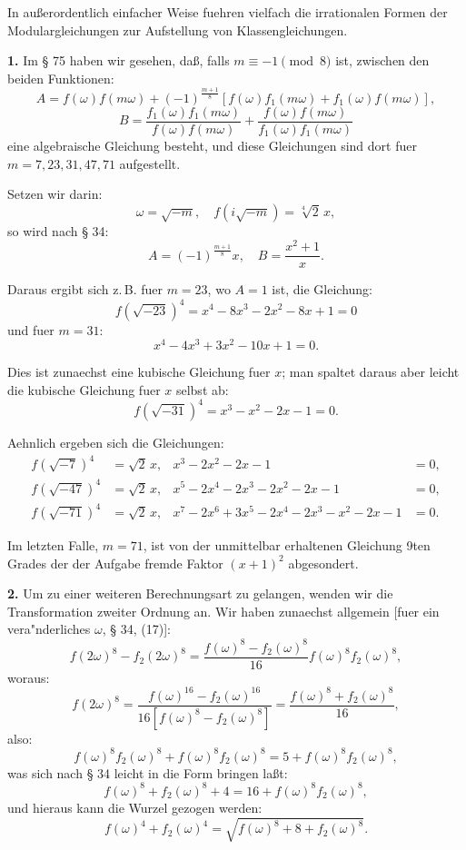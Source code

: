 \documentclass[12pt,a4paper]{article}
\theoremstyle{plain}
\theoremstyle{definition}
\theoremstyle{remark}
\begin{document}
In au\ss{}erordentlich einfacher Weise fuehren vielfach die irrationalen Formen der Modulargleichungen zur Aufstellung von Klassengleichungen.

\textbf{1.} Im \S{} 75 haben wir gesehen, da\ss{}, falls $m \equiv -1 \pmod{8}$ ist, zwischen den beiden Funktionen:
\[
A = f(\omega)f(m\omega) + (-1)^{\frac{m+1}{8}} \left[f(\omega)f_1(m\omega) + f_1(\omega)f(m\omega)\right],
\]
\[
B = \frac{f_1(\omega)f_1(m\omega)}{f(\omega)f(m\omega)} + \frac{f(\omega)f(m\omega)}{f_1(\omega)f_1(m\omega)}
\]
eine algebraische Gleichung besteht, und diese Gleichungen sind dort fuer $m = 7, 23, 31, 47, 71$ aufgestellt.

Setzen wir darin:
\[
\omega = \sqrt{-m}, \quad f(i\sqrt{-m}) = \sqrt[4]{2}\, x,
\]
so wird nach \S{} 34:
\[
A = (-1)^{\frac{m+1}{8}} x, \quad B = \frac{x^2 + 1}{x}.
\]

Daraus ergibt sich z.\,B. fuer $m = 23$, wo $A = 1$ ist, die Gleichung:
\begin{equation}\label{eq:131_1}
f(\sqrt{-23})^4 = x^4 - 8x^3 - 2x^2 - 8x + 1 = 0
\end{equation}
und fuer $m = 31$:
\begin{equation}\label{eq:131_2}
x^4 - 4x^3 + 3x^2 - 10x + 1 = 0.
\end{equation}

Dies ist zunaechst eine kubische Gleichung fuer $x$; man spaltet daraus aber leicht die kubische Gleichung fuer $x$ selbst ab:
\begin{equation}\label{eq:131_3}
f(\sqrt{-31})^4 = x^3 - x^2 - 2x - 1 = 0.
\end{equation}

Aehnlich ergeben sich die Gleichungen:
\begin{align}
f(\sqrt{-7})^4 &= \sqrt{2}\, x, & x^3 - 2x^2 - 2x - 1 &= 0, \label{eq:131_4}\\
f(\sqrt{-47})^4 &= \sqrt{2}\, x, & x^5 - 2x^4 - 2x^3 - 2x^2 - 2x - 1 &= 0, \label{eq:131_5}\\
f(\sqrt{-71})^4 &= \sqrt{2}\, x, & x^7 - 2x^6 + 3x^5 - 2x^4 - 2x^3 - x^2 - 2x - 1 &= 0. \label{eq:131_6}
\end{align}

Im letzten Falle, $m = 71$, ist von der unmittelbar erhaltenen Gleichung 9ten Grades der der Aufgabe fremde Faktor $(x + 1)^2$ abgesondert.

\textbf{2.} Um zu einer weiteren Berechnungsart zu gelangen, wenden wir die Transformation zweiter Ordnung an. Wir haben zunaechst allgemein [fuer ein vera"nderliches $\omega$, \S{} 34, (17)]:
\[
f(2\omega)^8 - f_2(2\omega)^8 = \frac{f(\omega)^8 - f_2(\omega)^8}{16} f(\omega)^8 f_2(\omega)^8,
\]
woraus:
\[
f(2\omega)^8 = \frac{f(\omega)^{16} - f_2(\omega)^{16}}{16[f(\omega)^8 - f_2(\omega)^8]} = \frac{f(\omega)^8 + f_2(\omega)^8}{16},
\]
also:
\[
f(\omega)^8 f_2(\omega)^8 + f(\omega)^8 f_2(\omega)^8 = 5 + f(\omega)^8 f_2(\omega)^8,
\]
was sich nach \S{} 34 leicht in die Form bringen la\ss{}t:
\[
f(\omega)^8 + f_2(\omega)^8 + 4 = 16 + f(\omega)^8 f_2(\omega)^8,
\]
und hieraus kann die Wurzel gezogen werden:
\begin{equation}\label{eq:131_9}
f(\omega)^4 + f_2(\omega)^4 = \sqrt{f(\omega)^8 + 8 + f_2(\omega)^8}.
\end{equation}
\end{document}
